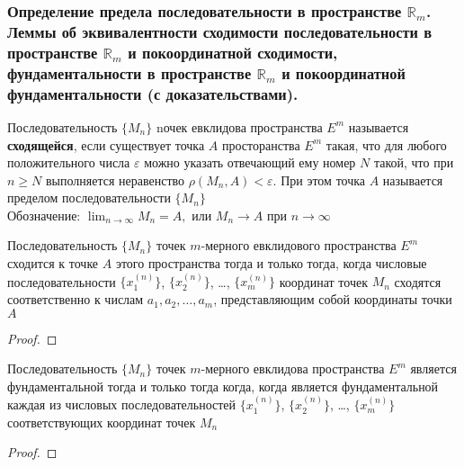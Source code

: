 \documentclass[10pt]{article}
\begin{document}
    \subsubsection{Определение предела последовательности в пространстве \texorpdfstring{$\mathbb{R}_m$}{Rm}. Леммы об эквивалентности сходимости последовательности в пространстве \texorpdfstring{$\mathbb{R}_m$}{Rm} и покоординатной сходимости, фундаментальности в пространстве \texorpdfstring{$\mathbb{R}_m$}{Rm} и покоординатной фундаментальности (с доказательствами).}
    \begin{definition}
        Последовательность $\{M_n\}$ nочек евклидова пространства $E^m$ называется \textbf{сходящейся}, если существует точка $A$ просторанства $E^m$ такая, что для любого положительного числа $\varepsilon$ можно указать отвечающий ему номер $N$ такой, что при $n \geq N$ выполняется неравенство $\rho(M_n, A) < \varepsilon$. При этом точка $A$ называется пределом последовательности $\{M_n\}$\\
        Обозначение: $\lim_{n \to \infty} M_n = A, \text{ или } M_n \to A \text{ при } n \to \infty$
    \end{definition}
    \begin{lemma}
        Последовательность $\{M_n\}$ точек $m$-мерного евклидового пространства $E^m$ сходится к точке $A$ этого пространства тогда и только тогда, когда числовые последовательности $\{x_1^{(n)}\}$, $\{x_2^{(n)}\}$, \ldots, $\{x_m^{(n)}\}$ координат точек $M_n$ сходятся соответственно к числам $a_1, a_2, \ldots, a_m$, представляющим собой координаты точки $A$
    \end{lemma}
    \begin{proof}
    \end{proof}
    \begin{lemma}
        Последовательность $\{M_n\}$ точек $m$-мерного евклидова пространства $E^m$ является фундаментальной тогда и только тогда когда, когда является фундаментальной каждая из числовых последовательностей $\{x_1^{(n)}\}$, $\{x_2^{(n)}\}$, \ldots, $\{x_m^{(n)}\}$ соответствующих координат точек $M_n$
    \end{lemma}
    \begin{proof}
    \end{proof}
\end{document}
